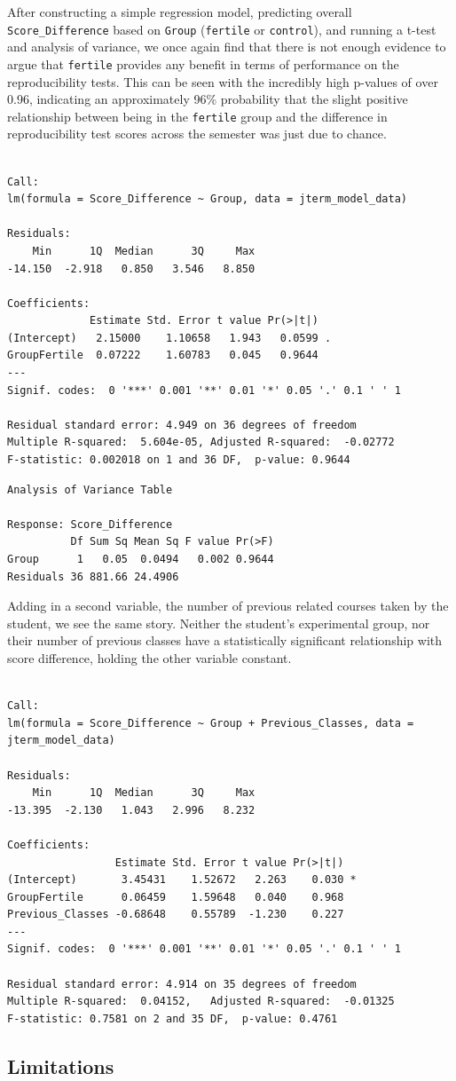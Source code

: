 \documentclass[12pt,twoside]{reedthesis}
\begin{document}
After constructing a simple regression model, predicting overall \texttt{Score\_Difference} based on \texttt{Group} (\texttt{fertile} or \texttt{control}), and running a t-test and analysis of variance, we once again find that there is not enough evidence to argue that \texttt{fertile} provides any benefit in terms of performance on the reproducibility tests. This can be seen with the incredibly high p-values of over 0.96, indicating an approximately 96\% probability that the slight positive relationship between being in the \texttt{fertile} group and the difference in reproducibility test scores across the semester was just due to chance.
\begin{verbatim}

Call:
lm(formula = Score_Difference ~ Group, data = jterm_model_data)

Residuals:
    Min      1Q  Median      3Q     Max 
-14.150  -2.918   0.850   3.546   8.850 

Coefficients:
             Estimate Std. Error t value Pr(>|t|)  
(Intercept)   2.15000    1.10658   1.943   0.0599 .
GroupFertile  0.07222    1.60783   0.045   0.9644  
---
Signif. codes:  0 '***' 0.001 '**' 0.01 '*' 0.05 '.' 0.1 ' ' 1

Residual standard error: 4.949 on 36 degrees of freedom
Multiple R-squared:  5.604e-05, Adjusted R-squared:  -0.02772 
F-statistic: 0.002018 on 1 and 36 DF,  p-value: 0.9644
\end{verbatim}
\begin{verbatim}
Analysis of Variance Table

Response: Score_Difference
          Df Sum Sq Mean Sq F value Pr(>F)
Group      1   0.05  0.0494   0.002 0.9644
Residuals 36 881.66 24.4906               
\end{verbatim}
Adding in a second variable, the number of previous related courses taken by the student, we see the same story. Neither the student's experimental group, nor their number of previous classes have a statistically significant relationship with score difference, holding the other variable constant.
\begin{verbatim}

Call:
lm(formula = Score_Difference ~ Group + Previous_Classes, data = jterm_model_data)

Residuals:
    Min      1Q  Median      3Q     Max 
-13.395  -2.130   1.043   2.996   8.232 

Coefficients:
                 Estimate Std. Error t value Pr(>|t|)  
(Intercept)       3.45431    1.52672   2.263    0.030 *
GroupFertile      0.06459    1.59648   0.040    0.968  
Previous_Classes -0.68648    0.55789  -1.230    0.227  
---
Signif. codes:  0 '***' 0.001 '**' 0.01 '*' 0.05 '.' 0.1 ' ' 1

Residual standard error: 4.914 on 35 degrees of freedom
Multiple R-squared:  0.04152,   Adjusted R-squared:  -0.01325 
F-statistic: 0.7581 on 2 and 35 DF,  p-value: 0.4761
\end{verbatim}
\hypertarget{limitations}{%
\subsection{Limitations}\label{limitations}}
\end{document}
